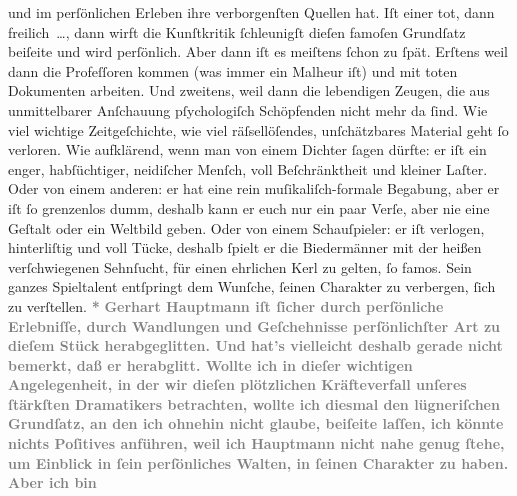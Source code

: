 \begin{ledgroupsized}[t]{13cm}
{{                  und im perſönlichen Erleben ihre verborgenſten Quellen hat. Iſt einer tot, dann
                     freilich {\dots}, dann wirft die Kunſtkritik
                  ſchleunigſt dieſen famoſen Grundſatz beiſeite und wird perſönlich. Aber dann iſt
                  es meiſtens ſchon zu ſpät. Erſtens weil dann die Profeſſoren kommen (was immer ein
                  Malheur iſt) und mit toten Dokumenten arbeiten. Und zweitens, weil dann die
                  lebendigen Zeugen, die aus unmittelbarer Anſchauung pſychologiſch Schöpfenden
                  nicht mehr da ſind. Wie viel wichtige Zeitgeſchichte, wie viel räſsellöſendes,
                  unſchätzbares Material geht ſo verloren. Wie aufklärend, wenn man von einem
                  Dichter ſagen dürfte: er iſt ein enger, habſüchtiger, neidiſcher Menſch, voll
                  Beſchränktheit und kleiner Laſter. Oder von einem anderen: er hat eine rein
                  muſikaliſch-formale Begabung, aber er iſt ſo grenzenlos dumm, deshalb kann er euch
                  nur ein paar Verſe, aber nie eine Geſtalt oder ein Weltbild geben. Oder von einem
                  Schauſpieler: er iſt verlogen, hinterliſtig und voll Tücke, deshalb ſpielt er die
                  Biedermänner mit der heißen verſchwiegenen Sehnſucht, für einen ehrlichen Kerl zu
                  gelten, ſo famos. Sein ganzes Spieltalent entſpringt dem Wunſche, ſeinen Charakter
                  zu verbergen, ſich zu verſtellen.}}\pend
           \pstart
           \centering{}\textcolor{gray}{\textbf{*}}\pend
           \pstart
           \noindent{}\textcolor{gray}{\textbf{Gerhart Hauptmann iſt
                  ſicher durch perſönliche Erlebniſſe, durch Wandlungen und Geſchehnisse
                  perſönlichſter Art zu dieſem Stück herabgeglitten. Und hat’s vielleicht deshalb
                  gerade nicht bemerkt, daß er herabglitt. Wollte ich in dieſer wichtigen
                  Angelegenheit, in der wir dieſen plötzlichen Kräfteverfall unſeres ſtärkſten
                  Dramatikers betrachten, wollte ich diesmal den lügneriſchen Grundſatz, an den ich
                  ohnehin nicht glaube, beiſeite laſſen, ich könnte nichts Poſitives anführen, weil
                  ich Hauptmann nicht nahe genug ſtehe, um
                  Einblick in ſein perſönliches Walten, in ſeinen Charakter zu haben. Aber ich bin
}}
\end{ledgroupsized}
